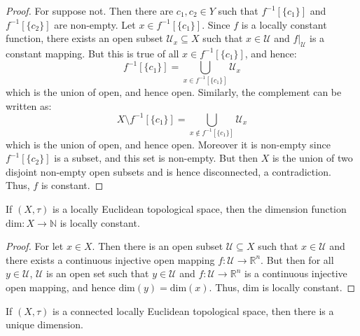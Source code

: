 \documentclass{article}                                                        %
\begin{document}
        \begin{proof}
            For suppose not. Then there are $c_{1},c_{2}\in{Y}$ such that
            $f^{\minus{1}}[\{c_{1}\}]$ and $f^{\minus{1}}[\{c_{2}\}]$ are
            non-empty. Let $x\in{f}^{\minus{1}}[\{c_{1}\}]$. Since $f$ is a
            locally constant function, there exists an open subset
            $\mathcal{U}_{x}\subseteq{X}$ such that $x\in\mathcal{U}$ and
            $f|_{\mathcal{U}}$ is a constant mapping. But this is true of all
            $x\in{f}^{\minus{1}}[\{c_{1}\}]$, and hence:
            \begin{equation}
                f^{\minus{1}}[\{c_{1}\}]=
                    \bigcup_{x\in{f}^{\minus{1}}[\{c_{1}\}]}\mathcal{U}_{x}
            \end{equation}
            which is the union of open, and hence open. Similarly, the
            complement can be written as:
            \begin{equation}
                X\setminus{f}^{\minus{1}}[\{c_{1}\}]=
                    \bigcup_{x\notin{f}^{\minus{1}}[\{c_{1}\}]}\mathcal{U}_{x}
            \end{equation}
            which is the union of open, and hence open. Moreover it is non-empty
            since $f^{\minus{1}}[\{c_{2}\}]$ is a subset, and this set is
            non-empty. But then $X$ is the union of two disjoint non-empty open
            subsets and is hence disconnected, a contradiction. Thus, $f$ is
            constant.
        \end{proof}
        \begin{theorem}
            If $(X,\tau)$ is a locally Euclidean topological space, then the
            dimension function $\textrm{dim}:X\rightarrow\mathbb{N}$ is locally
            constant.
        \end{theorem}
        \begin{proof}
            For let $x\in{X}$. Then there is an open subset
            $\mathcal{U}\subseteq{X}$ such that $x\in\mathcal{U}$ and
            there exists a continuous injective open mapping
            $f:\mathcal{U}\rightarrow\mathbb{R}^{n}$. But then for all
            $y\in\mathcal{U}$, $\mathcal{U}$ is an open set such that
            $y\in\mathcal{U}$ and $f:\mathcal{U}\rightarrow\mathbb{R}^{n}$ is a
            continuous injective open mapping, and hence
            $\textrm{dim}(y)=\textrm{dim}(x)$. Thus, $\textrm{dim}$ is locally
            constant.
        \end{proof}
        \begin{theorem}
            If $(X,\tau)$ is a connected locally Euclidean topological space,
            then there is a unique dimension.
        \end{theorem}
\end{document}
